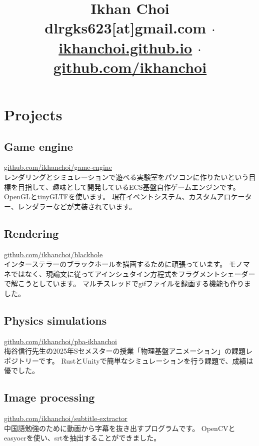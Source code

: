 \documentclass[11pt,a4paper]{article}
\title{\vspace{-40pt}
	Ikhan Choi\\[5pt]\small
	\faEnvelopeSquare\quad dlrgks623[at]gmail.com
	\quad$\cdot$\quad
	\faHome\quad\href{https://ikhanchoi.github.io}{ikhanchoi.github.io}
	\quad$\cdot$\quad
	\faGithub\quad\href{https://github.com/ikhanchoi}{github.com/ikhanchoi}
	\vspace{-5em}}
\date{}
\begin{document}
\maketitle



\section*{Projects}

\subsection*{Game engine}
\faGithub\quad\href{https://github.com/ikhanchoi/game-engine}{github.com/ikhanchoi/game-engine}\\[4pt]
\faArrowRight\quad
レンダリングとシミュレーションで遊べる実験室をパソコンに作りたいという目標を目指して、趣味として開発しているECS基盤自作ゲームエンジンです。
OpenGLとtinyGLTFを使います。
現在イベントシステム、カスタムアロケーター、レンダラーなどが実装されています。

\subsection*{Rendering}
\faGithub\quad\href{https://github.com/ikhanchoi/blackhole}{github.com/ikhanchoi/blackhole}\\[4pt]
\faArrowRight\quad
インターステラーのブラックホールを描画するために頑張っています。
モノマネではなく、現論文に従ってアインシュタイン方程式をフラグメントシェーダーで解こうとしています。
マルチスレッドでgifファイルを録画する機能も作りました。

\subsection*{Physics simulations}
\faGithub\quad\href{https://github.com/ikhanchoi/pba-ikhanchoi}{github.com/ikhanchoi/pba-ikhanchoi}\\[4pt]
\faArrowRight\quad
梅谷信行先生の2025年Sセメスターの授業「物理基盤アニメーション」の課題レポジトリーです。
RustとUnityで簡単なシミュレーションを行う課題で、成績は優でした。

\subsection*{Image processing}
\faGithub\quad\href{https://github.com/ikhanchoi/subtitle-extractor}{github.com/ikhanchoi/subtitle-extractor}\\[4pt]
\faArrowRight\quad
中国語勉強のために動画から字幕を抜き出すプログラムです。
OpenCVとeasyocrを使い、srtを抽出することができました。
\end{document}
